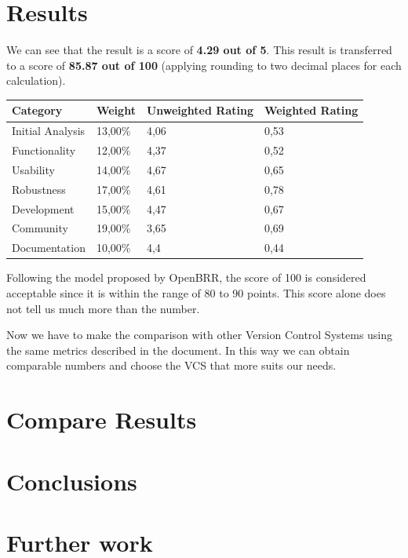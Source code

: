 \documentclass[11pt]{scrartcl}
\begin{document}
\section{Results}

We can see that the result is a score of \textbf{4.29 out of 5}. This result is transferred to a score of \textbf{85.87 out of 100} (applying rounding to two decimal places for each calculation).

\begin{tabular}{|l|l|l|l|}
    \hline {\bf Category} & {\bf Weight} & {\bf Unweighted Rating} & {\bf Weighted Rating}\\
    \hline Initial Analysis	 & 13,00\% & 4,06 & 0,53 \\
    \hline Functionality & 12,00\% & 4,37 & 0,52\\
    \hline Usability & 14,00\% & 4,67 & 0,65\\
    \hline Robustness & 17,00\% & 4,61 & 0,78\\
    \hline Development & 15,00\% & 4,47 & 0,67\\
    \hline Community & 19,00\% & 3,65 & 0,69\\
    \hline Documentation & 10,00\% & 4,4 & 0,44\\
    \hline
\end{tabular}

\par Following the model proposed by OpenBRR, the score of 100 is considered acceptable since it is within the range of 80 to 90 points. This score alone does not tell us much more than the number.

\par Now we have to make the comparison with other Version Control Systems using the same metrics described in the document. In this way we can obtain comparable numbers and choose the VCS that more suits our needs.

\section{Compare Results}


\section{Conclusions}

\section{Further work}
\end{document}
